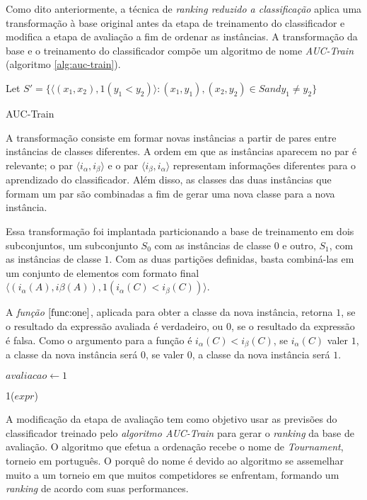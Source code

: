 Como dito anteriormente, a técnica de \emph{ranking reduzido a classificação} aplica uma transformação à base original antes da etapa de treinamento do classificador e modifica a etapa de avaliação a fim de ordenar as instâncias. A transformação da base e o treinamento do classificador compõe um algoritmo de nome \emph{AUC-Train} (algoritmo \ref{alg:auc-train}).

\begin{algorithm}
    Let $S' = \{\langle (x_1, x_2), 1(y_1 < y_2) \rangle : (x_1, y_1), (x_2, y_2) \in S and y_1 \neq y_2\}$\;
    
    \caption{AUC-Train}
    \label{alg:auc-train}
\end{algorithm}

A transformação consiste em formar novas instâncias a partir de pares entre instâncias de classes diferentes. A ordem em que as instâncias aparecem no par é relevante; o par $\langle i_{\alpha}, i_{\beta} \rangle$ e o par $\langle i_{\beta}, i_{\alpha} \rangle$ representam informações diferentes para o aprendizado do classificador. Além disso, as classes das duas instâncias que formam um par são combinadas a fim de gerar uma nova classe para a nova instância.

Essa transformação foi implantada particionando a base de treinamento em dois subconjuntos, um subconjunto $S_0$ com as instâncias de classe $0$ e outro, $S_1$, com as instâncias de classe $1$. Com as duas partições definidas, basta combiná-las em um conjunto de elementos com formato final $\langle (i_{\alpha}(A), i{\beta}(A)), 1(i_{\alpha}(C) < i_{\beta}(C)) \rangle$.

A \emph{função $\ref{func:one}$}, aplicada para obter a classe da nova instância, retorna $1$, se o resultado da expressão avaliada é verdadeiro, ou $0$, se o resultado da expressão é falsa. Como o argumento para a função é $i_{\alpha}(C) < i_{\beta}(C)$, se $i_{\alpha}(C)$ valer $1$, a classe da nova instância será $0$, se valer $0$, a classe da nova instância será $1$.

\begin{function}
    $avaliacao \gets 1$



    \caption{1($expr$)}
    \label{func:one}
\end{function}

A modificação da etapa de avaliação tem como objetivo usar as previsões do classificador treinado pelo \emph{algoritmo \emph{AUC-Train}} para gerar o \emph{ranking} da base de avaliação. O algoritmo que efetua a ordenação recebe o nome de \emph{Tournament}, torneio em português. O porquê do nome é devido ao algoritmo se assemelhar muito a um torneio em que muitos competidores se enfrentam, formando um \emph{ranking} de acordo com suas performances.

